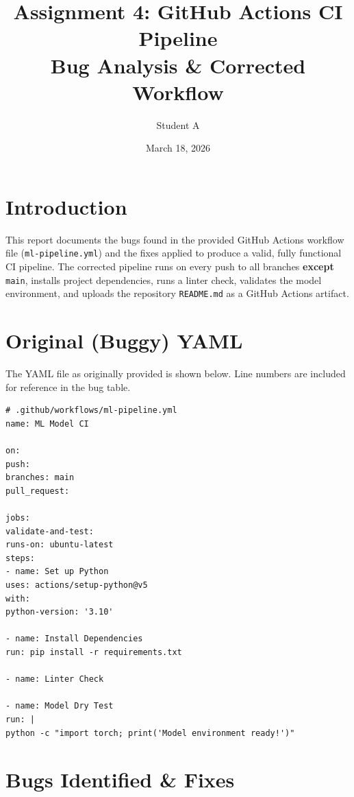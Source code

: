 \documentclass[11pt,a4paper]{article}
\title{\textbf{Assignment 4: GitHub Actions CI Pipeline}\\[0.5em]
\large Bug Analysis \& Corrected Workflow}
\author{Student A}
\date{March 18, 2026}
\begin{document}
\maketitle

\section{Introduction}

This report documents the bugs found in the provided GitHub Actions workflow file (\texttt{ml-pipeline.yml}) and the fixes applied to produce a valid, fully functional CI pipeline. The corrected pipeline runs on every push to all branches \textbf{except} \texttt{main}, installs project dependencies, runs a linter check, validates the model environment, and uploads the repository \texttt{README.md} as a GitHub Actions artifact.

\section{Original (Buggy) YAML}

The YAML file as originally provided is shown below. Line numbers are included for reference in the bug table.

\begin{lstlisting}[style=yamlstyle, caption={Original ml-pipeline.yml (buggy)}]
# .github/workflows/ml-pipeline.yml
name: ML Model CI

on:
push:
branches: main
pull_request:

jobs:
validate-and-test:
runs-on: ubuntu-latest
steps:
- name: Set up Python
uses: actions/setup-python@v5
with:
python-version: '3.10'

- name: Install Dependencies
run: pip install -r requirements.txt

- name: Linter Check

- name: Model Dry Test
run: |
python -c "import torch; print('Model environment ready!')"
\end{lstlisting}

\section{Bugs Identified \& Fixes}
\end{document}
